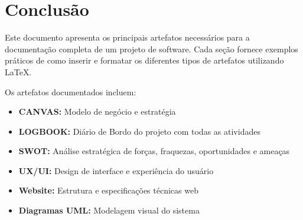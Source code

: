 \documentclass[11pt,a4paper]{article}
\begin{document}
\newpage
\section*{Conclusão}

Este documento apresenta os principais artefatos necessários para a documentação completa de um projeto de software. Cada seção fornece exemplos práticos de como inserir e formatar os diferentes tipos de artefatos utilizando \LaTeX.

Os artefatos documentados incluem:
\begin{itemize}
    \item \textbf{CANVAS:} Modelo de negócio e estratégia
    \item \textbf{LOGBOOK:} Diário de Bordo do projeto com todas as atividades
    \item \textbf{SWOT:} Análise estratégica de forças, fraquezas, oportunidades e ameaças
    \item \textbf{UX/UI:} Design de interface e experiência do usuário
    \item \textbf{Website:} Estrutura e especificações técnicas web
    \item \textbf{Diagramas UML:} Modelagem visual do sistema
\end{itemize}



\end{document}
